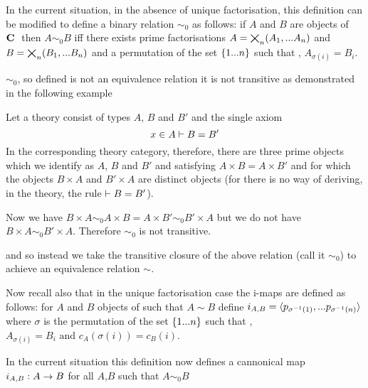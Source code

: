 \documentclass[10pt,a4paper]{scrartcl}
\begin{document}
In the current situation, in the absence of unique factorisation, this definition 
can be modified to define a binary relation $\sim_0$ as follows:
if $A$ and $B$ are objects of $\textbf{C}\ $ then $A \sim_0 B$ 
iff there exists prime factorisations 
$A = \bigtimes_{n}(A_1,...A_n)$ 
and $B= \bigtimes_{n}(B_1,...B_n)$ 
and  a permutation of the set $\left\{1...n\right\}$ such that 
\foreachi, $A_{\sigma(i)}=B_i$.

$\sim_0$, so defined is not
an equivalence relation  it is not transitive as demonstrated in the following example
\begin{notebox}[Example]
Let a theory consist of types $A$, $B$ and $B'$ and the single axiom 
\begin{equation}
x \in A \vdash B=B'
\end{equation}
In the corresponding theory category, therefore, there are three prime objects which
we identify as $A$, $B$ and $B'$ and satisfying $A \times B = A \times B'$ and 
for which the objects $B \times A$ and $B' \times A$ are distinct objects (for there is no way of deriving, in the theory, the rule $\vdash B = B'$). 

Now we have $B \times A \sim_0 A \times B = A \times B' \sim_0 B' \times A$
but we do not have $B \times A \sim_0 B' \times A$. Therefore $\sim_0$ is not transitive.
\end{notebox}
and so instead we take the transitive closure of the above relation (call it $\sim_0$) to
achieve an equivalence relation $\sim$.

Now recall also that in the unique factorisation case the i-maps are defined as follows:
for $A$ and $B$ objects of \catcw such that $A\sim B$ define $i_{A,B}=\langle p_{\sigma^{-1}(1)},...p_{\sigma^{-1}(n)}\rangle$ where $\sigma$ is the permutation of the set $\left\{1...n\right\}$ 
such that \foreachi, $A_{\sigma(i)}=B_i \mbox{ and }  c_A(\sigma(i)) = c_B(i)$. 


\begin{notebox}
In the current situation this definition now defines a cannonical map $i_{A,B}: A \rightarrow B$ 
for all $A$,$B$ such that $A \sim_0 B$ 
\end{notebox}
\end{document}
